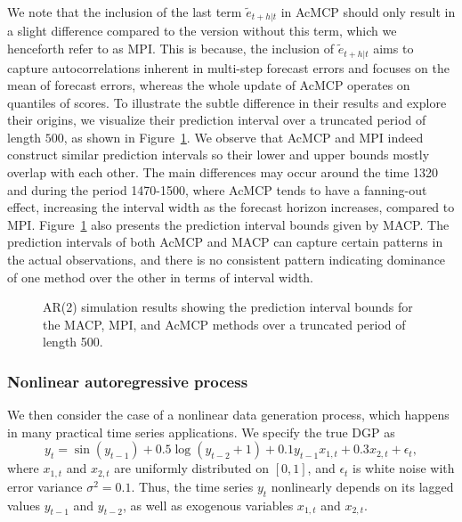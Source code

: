 \documentclass[
  11pt,
  a4paper,
]{article}
\theoremstyle{plain}
\theoremstyle{remark}
\begin{document}
We note that the inclusion of the last term \(\tilde{e}_{t+h|t}\) in
AcMCP should only result in a slight difference compared to the version
without this term, which we henceforth refer to as MPI. This is because,
the inclusion of \(\tilde{e}_{t+h|t}\) aims to capture autocorrelations
inherent in multi-step forecast errors and focuses on the mean of
forecast errors, whereas the whole update of AcMCP operates on quantiles
of scores. To illustrate the subtle difference in their results and
explore their origins, we visualize their prediction interval over a
truncated period of length \(500\), as shown in
Figure~\ref{fig-AR2_timeplot}. We observe that AcMCP and MPI indeed
construct similar prediction intervals so their lower and upper bounds
mostly overlap with each other. The main differences may occur around
the time 1320 and during the period 1470-1500, where AcMCP tends to have
a fanning-out effect, increasing the interval width as the forecast
horizon increases, compared to MPI. Figure~\ref{fig-AR2_timeplot} also
presents the prediction interval bounds given by MACP. The prediction
intervals of both AcMCP and MACP can capture certain patterns in the
actual observations, and there is no consistent pattern indicating
dominance of one method over the other in terms of interval width.

\begin{figure}


\caption{\label{fig-AR2_timeplot}AR(2) simulation results showing the
prediction interval bounds for the MACP, MPI, and AcMCP methods over a
truncated period of length 500.}

\end{figure}%

\subsubsection{Nonlinear autoregressive
process}\label{nonlinear-autoregressive-process}

We then consider the case of a nonlinear data generation process, which
happens in many practical time series applications. We specify the true
DGP as \[
y_t = \sin(y_{t-1}) + 0.5\log(y_{t-2} + 1) + 0.1y_{t-1}x_{1,t} + 0.3x_{2,t} + \epsilon_{t},
\] where \(x_{1,t}\) and \(x_{2,t}\) are uniformly distributed on
\([0,1]\), and \(\epsilon_{t}\) is white noise with error variance
\(\sigma^2 = 0.1\). Thus, the time series \(y_t\) nonlinearly depends on
its lagged values \(y_{t-1}\) and \(y_{t-2}\), as well as exogenous
variables \(x_{1,t}\) and \(x_{2,t}\).
\end{document}
